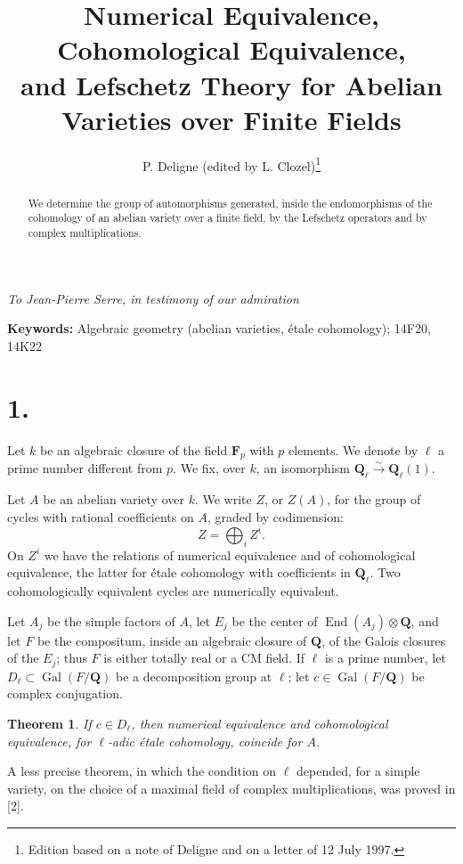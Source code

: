 \documentclass[11pt,a4paper]{article}
\title{\textbf{Numerical Equivalence, Cohomological Equivalence,\\
and Lefschetz Theory for Abelian Varieties over Finite Fields}}
\author{P. Deligne (edited by L. Clozel)\thanks{Edition based on a note of Deligne and on a letter of 12 July 1997.}}
\date{}
\theoremstyle{plain}
\newtheorem{theorem}{Theorem}
\theoremstyle{definition}
\DeclareMathOperator{\Gal}{Gal}
\DeclareMathOperator{\End}{End}
\begin{document}
\maketitle

\begin{center}
\textit{To Jean-Pierre Serre, in testimony of our admiration}
\end{center}

\begin{abstract}\noindent
We determine the group of automorphisms generated, inside the endomorphisms of the cohomology of an abelian variety over a finite field, by the Lefschetz operators and by complex multiplications.
\end{abstract}

\noindent\textbf{Keywords:} Algebraic geometry (abelian varieties, \'etale cohomology); 14F20, 14K22

\section*{1.}

Let $k$ be an algebraic closure of the field $\mathbf{F}_p$ with $p$ elements. We denote by $\ell$ a prime number different from $p$. We fix, over $k$, an isomorphism $\mathbf{Q}_\ell \xrightarrow{\sim} \mathbf{Q}_\ell(1)$.

Let $A$ be an abelian variety over $k$. We write $Z$, or $Z(A)$, for the group of cycles with rational coefficients on $A$, graded by codimension:
\[
Z = \bigoplus_i Z^i .
\]
On $Z^i$ we have the relations of numerical equivalence and of cohomological equivalence, the latter for \'etale cohomology with coefficients in $\mathbf{Q}_\ell$. Two cohomologically equivalent cycles are numerically equivalent.

Let $A_j$ be the simple factors of $A$, let $E_j$ be the center of $\End(A_j) \otimes \mathbf{Q}$, and let $F$ be the compositum, inside an algebraic closure of $\mathbf{Q}$, of the Galois closures of the $E_j$; thus $F$ is either totally real or a CM field. If $\ell$ is a prime number, let $D_\ell \subset \Gal(F/\mathbf{Q})$ be a decomposition group at $\ell$; let $c \in \Gal(F/\mathbf{Q})$ be complex conjugation.

\begin{theorem}
If $c \in D_\ell$, then numerical equivalence and cohomological equivalence, for $\ell$-adic \'etale cohomology, coincide for $A$.
\end{theorem}

A less precise theorem, in which the condition on $\ell$ depended, for a simple variety, on the choice of a maximal field of complex multiplications, was proved in [2].
\end{document}
